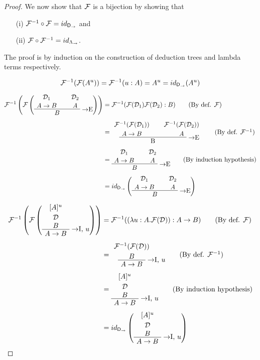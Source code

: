 \begin{proof}
We now show that $\mathcal{F}$ is a bijection by showing that
\begin{itemize}
\item[(i)] $\mathcal{F}^{-1} \circ \mathcal{F} = id_{\mathsf{D}_\to}$ and
\item[(ii)] $\mathcal{F} \circ \mathcal{F}^{-1} = id_{\Lambda_\to}$.
\end{itemize}
The proof is by induction on the construction of deduction trees and lambda
terms respectively.

\[
\mathcal{F}^{-1}(\mathcal{F}(A^u)) = \mathcal{F}^{-1}(u:A) = A^u = id_{\mathsf{D}_\to}(A^u)
\]

\begin{align*}
\chmapanta\left(\chmap\left(
  \AxiomC{$\mathcal{D}_1$}
  \noLine
  \UnaryInfC{$A \to B$}
  \AxiomC{$\mathcal{D}_2$}
  \noLine
  \UnaryInfC{$A$}
  \RightLabel{$\to$E}
  \BinaryInfC{$B$}
  \DisplayProof
\right)\right)
& =
  \chmapanta(\chmap(\mathcal{D}_1) \chmap(\mathcal{D}_2): B)
  \tag{By def. $\chmap$} \\[6pt]
& =
  \AxiomC{$\chmapanta(\chmap(\mathcal{D}_1))$}
  \noLine
  \UnaryInfC{$A \to B$}
  \AxiomC{$\chmapanta(\chmap(\mathcal{D}_2))$}
  \noLine
  \UnaryInfC{$A$}
  \RightLabel{$\to$E}
  \BinaryInfC{B}
  \DisplayProof \tag{By def. $\chmapanta$} \\[6pt]
& =
  \AxiomC{$\mathcal{D}_1$}
  \noLine
  \UnaryInfC{$A \to B$}
  \AxiomC{$\mathcal{D}_2$}
  \noLine
  \UnaryInfC{$A$}
  \RightLabel{$\to$E}
  \BinaryInfC{$B$}
  \DisplayProof \tag{By induction hypothesis} \\[6pt]
& =
  id_{\npiproofs}\left(
  \AxiomC{$\mathcal{D}_1$}
  \noLine
  \UnaryInfC{$A \to B$}
  \AxiomC{$\mathcal{D}_2$}
  \noLine
  \UnaryInfC{$A$}
  \RightLabel{$\to$E}
  \BinaryInfC{$B$}
  \DisplayProof
  \right)
\end{align*}

\begin{align*}
\chmapanta\left(\chmap\left(
  \AxiomC{$[A]^u$}
  \noLine
  \UnaryInfC{$\mathcal{D}$}
  \noLine
  \UnaryInfC{$B$}
  \RightLabel{$\to$I, $u$}
  \UnaryInfC{$A \to B$}
  \DisplayProof
\right)\right)
& =
  \chmapanta((\lambda u: A.\chmap(\mathcal{D})): A \to B)
  \tag{By def. $\chmap$} \\[6pt]
& =
  \AxiomC{$\chmapanta(\chmap(\mathcal{D}))$}
  \noLine
  \UnaryInfC{$B$}
  \RightLabel{$\to$I, $u$}
  \UnaryInfC{$A \to B$}
  \DisplayProof \tag{By def. $\chmapanta$} \\[6pt]
& =
  \AxiomC{$[A]^u$}
  \noLine
  \UnaryInfC{$\mathcal{D}$}
  \noLine
  \UnaryInfC{$B$}
  \RightLabel{$\to$I, $u$}
  \UnaryInfC{$A \to B$}
  \DisplayProof \tag{By induction hypothesis} \\[6pt]
& =
  id_{\npiproofs}\left(
  \AxiomC{$[A]^u$}
  \noLine
  \UnaryInfC{$\mathcal{D}$}
  \noLine
  \UnaryInfC{$B$}
  \RightLabel{$\to$I, $u$}
  \UnaryInfC{$A \to B$}
  \DisplayProof
  \right)
\end{align*}


\end{proof}
